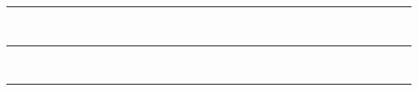 \documentclass[a4paper,10pt]{article}
\begin{document}
\begin{enumerate}
\begin{itemize}
\begin{itemize}
            \rule{100mm}{0.1mm} \\
            \rule{100mm}{0.1mm} \\
            \rule{100mm}{0.1mm}
        \end{itemize}
    \end{itemize}

\end{enumerate}
\end{document}
